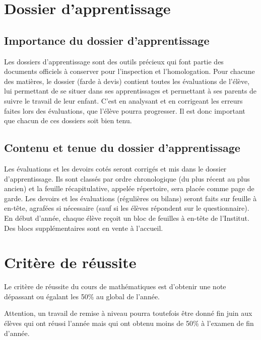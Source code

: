 \documentclass[parskip=half-, numbers=enddot]{scrartcl}
\begin{document}

\section{Dossier d'apprentissage}

\subsection{Importance du dossier d'apprentissage}

Les dossiers d'apprentissage sont des outils précieux qui font partie
des documents officiels à conserver pour l'inspection et l'homologation.
Pour chacune des matières, le dossier (farde à devis) contient toutes
les évaluations de l'élève, lui permettant de se situer dans ses
apprentissages et permettant à ses parents de suivre le travail de leur
enfant. C'est en analysant et en corrigeant les erreurs faites lors des
évaluations, que l'élève pourra progresser. Il est donc important que
chacun de ces dossiers soit bien tenu.

\subsection{Contenu et tenue du dossier d'apprentissage}

Les évaluations et les devoirs cotés seront corrigés et mis dans le
dossier d'apprentissage. Ils sont classés par ordre chronologique (du
plus récent au plus ancien) et la feuille récapitulative, appelée
répertoire, sera placée comme page de garde. Les devoirs et les
évaluations (régulières ou bilans) seront faits sur feuille à en-tête,
agrafées si nécessaire (sauf si les élèves répondent sur le
questionnaire). En début d'année, chaque élève reçoit un bloc de
feuilles à en-tête de l'Institut. Des blocs supplémentaires sont en
vente à l'accueil.

\section{Critère de réussite}

Le critère de réussite du cours de mathématiques est d'obtenir une note dépassant ou égalant les 50\% au global de l'année. 

Attention, un travail de remise à niveau pourra toutefois être donné fin juin aux élèves qui ont réussi l'année mais qui ont obtenu moins de 50\% à l'examen de fin d'année.
\end{document}
